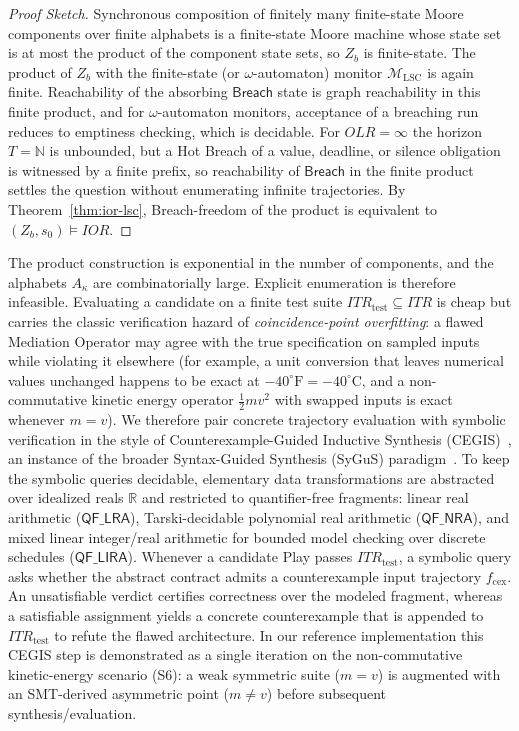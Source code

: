 \begin{proof}[Proof Sketch]
Synchronous composition of finitely many finite-state Moore components over finite alphabets is a finite-state Moore machine whose state set is at most the product of the component state sets, so $Z_b$ is finite-state.  The product of $Z_b$ with the finite-state (or $\omega$-automaton) monitor $\mathcal{M}_{\text{LSC}}$ is again finite.  Reachability of the absorbing $\mathsf{Breach}$ state is graph reachability in this finite product, and for $\omega$-automaton monitors, acceptance of a breaching run reduces to emptiness checking, which is decidable.  For $OLR = \infty$ the horizon $T = \mathbb{N}$ is unbounded, but a Hot Breach of a value, deadline, or silence obligation is witnessed by a finite prefix, so reachability of $\mathsf{Breach}$ in the finite product settles the question without enumerating infinite trajectories.  By Theorem~\ref{thm:ior-lsc}, Breach-freedom of the product is equivalent to $(Z_b, s_0) \models IOR$.
\end{proof}

The product construction is exponential in the number of components, and the alphabets $A_{\kappa}$ are combinatorially large.  Explicit enumeration is therefore infeasible.  Evaluating a candidate on a finite test suite $ITR_{\text{test}} \subseteq ITR$ is cheap but carries the classic verification hazard of \emph{coincidence-point overfitting}: a flawed Mediation Operator may agree with the true specification on sampled inputs while violating it elsewhere (for example, a unit conversion that leaves numerical values unchanged happens to be exact at $-40^\circ\text{F} = -40^\circ\text{C}$, and a non-commutative kinetic energy operator $\frac{1}{2} m v^2$ with swapped inputs is exact whenever $m = v$).  We therefore pair concrete trajectory evaluation with symbolic verification in the style of Counterexample-Guided Inductive Synthesis (CEGIS)~\cite{SolarLezama2008Sketch}, an instance of the broader Syntax-Guided Synthesis (SyGuS) paradigm~\cite{AlurEtAl2013SyGuS}.  To keep the symbolic queries decidable, elementary data transformations are abstracted over idealized reals $\mathbb{R}$ and restricted to quantifier-free fragments: linear real arithmetic ($\mathsf{QF\_LRA}$), Tarski-decidable polynomial real arithmetic ($\mathsf{QF\_NRA}$), and mixed linear integer/real arithmetic for bounded model checking over discrete schedules ($\mathsf{QF\_LIRA}$).  Whenever a candidate Play passes $ITR_{\text{test}}$, a symbolic query asks whether the abstract contract admits a counterexample input trajectory $f_{\text{cex}}$.  An unsatisfiable verdict certifies correctness over the modeled fragment, whereas a satisfiable assignment yields a concrete counterexample that is appended to $ITR_{\text{test}}$ to refute the flawed architecture.  In our reference implementation this CEGIS step is demonstrated as a single iteration on the non-commutative kinetic-energy scenario (S6): a weak symmetric suite ($m = v$) is augmented with an SMT-derived asymmetric point ($m \neq v$) before subsequent synthesis/evaluation.
